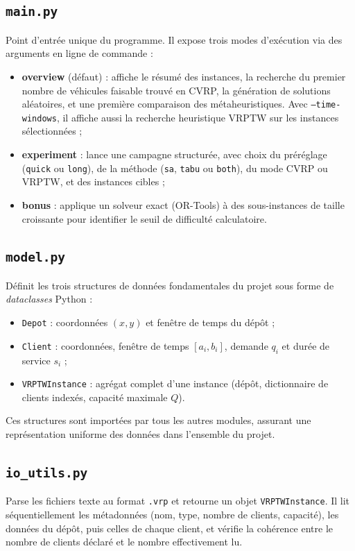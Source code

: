\documentclass[11pt,a4paper]{article}
\begin{document}
\subsection{\texttt{main.py}}
Point d'entrée unique du programme. Il expose trois modes d'exécution via des arguments en ligne de commande :
\begin{itemize}
    \item \textbf{overview} (défaut) : affiche le résumé des instances, la recherche du premier nombre de véhicules faisable trouvé en CVRP, la génération de solutions aléatoires, et une première comparaison des métaheuristiques. Avec \texttt{--time-windows}, il affiche aussi la recherche heuristique VRPTW sur les instances sélectionnées ;
    \item \textbf{experiment} : lance une campagne structurée, avec choix du préréglage (\texttt{quick} ou \texttt{long}), de la méthode (\texttt{sa}, \texttt{tabu} ou \texttt{both}), du mode CVRP ou VRPTW, et des instances cibles ;
    \item \textbf{bonus} : applique un solveur exact (OR-Tools) à des sous-instances de taille croissante pour identifier le seuil de difficulté calculatoire.
\end{itemize}

\subsection{\texttt{model.py}}
Définit les trois structures de données fondamentales du projet sous forme de \textit{dataclasses} Python :
\begin{itemize}
    \item \texttt{Depot} : coordonnées \((x,y)\) et fenêtre de temps du dépôt ;
    \item \texttt{Client} : coordonnées, fenêtre de temps \([a_i, b_i]\), demande \(q_i\) et durée de service \(s_i\) ;
    \item \texttt{VRPTWInstance} : agrégat complet d'une instance (dépôt, dictionnaire de clients indexés, capacité maximale \(Q\)).
\end{itemize}
Ces structures sont importées par tous les autres modules, assurant une représentation uniforme des données dans l'ensemble du projet.

\subsection{\texttt{io\_utils.py}}
Parse les fichiers texte au format \texttt{.vrp} et retourne un objet \texttt{VRPTWInstance}. Il lit séquentiellement les métadonnées (nom, type, nombre de clients, capacité), les données du dépôt, puis celles de chaque client, et vérifie la cohérence entre le nombre de clients déclaré et le nombre effectivement lu.
\end{document}
